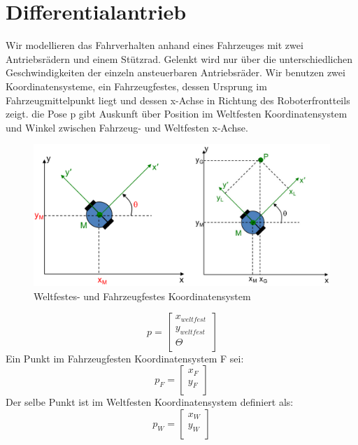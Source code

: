 \section{Differentialantrieb} 
Wir modellieren das Fahrverhalten anhand eines Fahrzeuges mit zwei Antriebsrädern und einem Stützrad. Gelenkt wird nur über die unterschiedlichen Geschwindigkeiten der einzeln ansteuerbaren Antriebsräder. Wir benutzen zwei Koordinatensysteme, ein Fahrzeugfestes, dessen Ursprung im Fahrzeugmittelpunkt liegt und dessen x-Achse in Richtung des Roboterfrontteils zeigt. die Pose p gibt Auskunft über Position im Weltfesten Koordinatensystem und Winkel zwischen Fahrzeug- und Weltfesten x-Achse.  
\begin{figure}[htb]
  \centering  
  \includegraphics[scale=1]{img/einfachesModell_1.png}
  \caption{Weltfestes- und Fahrzeugfestes Koordinatensystem\cite{robot}}
  \label{fig:Weltfestes- und Fahrzeugfestes Koordinatensystem}
\end{figure}
\begin{equation}
p =
\begin{bmatrix}
x_{weltfest}\\
y_{weltfest}\\
\Theta \\
\end{bmatrix}
\end{equation}
Ein Punkt im Fahrzeugfesten Koordinatensystem F sei: 
\begin{equation}
p_{F} =
\begin{bmatrix}
x_{F}\\
y_{F}\\
\end{bmatrix}
\end{equation}
Der selbe Punkt ist im Weltfesten Koordinatensystem definiert als: 
\begin{equation}
p_{W} =
\begin{bmatrix}
x_{W}\\
y_{W}\\
\end{bmatrix}
\end{equation}
